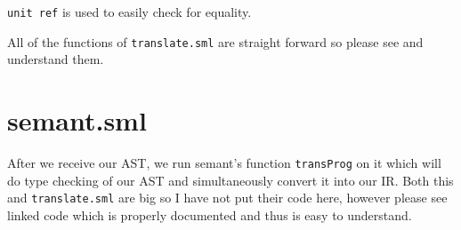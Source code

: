 \texttt{unit ref} is used to easily check for equality.

All of the functions of \texttt{translate.sml} are straight forward so please see and understand them.

\section{semant.sml}

After we receive our AST, we run semant's function \texttt{transProg} on it which will do type checking of our AST and simultaneously convert it into our IR. Both this and \texttt{translate.sml} are big so I have not put their code here, however please see linked code which is properly documented and thus is easy to understand.